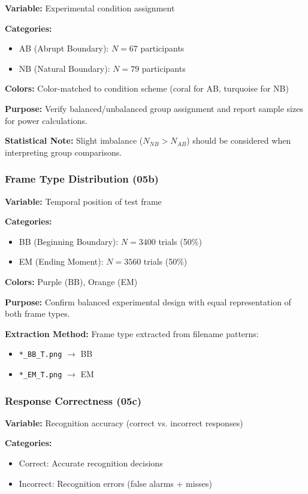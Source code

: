 \documentclass[12pt,a4paper]{article}
\begin{document}
\textbf{Variable:} Experimental condition assignment

\textbf{Categories:}
\begin{itemize}
    \item AB (Abrupt Boundary): $N=67$ participants
    \item NB (Natural Boundary): $N=79$ participants
\end{itemize}

\textbf{Colors:} Color-matched to condition scheme (coral for AB, turquoise for NB)

\textbf{Purpose:} Verify balanced/unbalanced group assignment and report sample sizes for power calculations.

\textbf{Statistical Note:} Slight imbalance ($N_{NB} > N_{AB}$) should be considered when interpreting group comparisons.

\subsubsection{Frame Type Distribution (05b)}

\textbf{Variable:} Temporal position of test frame

\textbf{Categories:}
\begin{itemize}
    \item BB (Beginning Boundary): $N=3400$ trials (50\%)
    \item EM (Ending Moment): $N=3560$ trials (50\%)
\end{itemize}

\textbf{Colors:} Purple (BB), Orange (EM)

\textbf{Purpose:} Confirm balanced experimental design with equal representation of both frame types.

\textbf{Extraction Method:} Frame type extracted from filename patterns:
\begin{itemize}
    \item \texttt{*\_BB\_T.png} $\rightarrow$ BB
    \item \texttt{*\_EM\_T.png} $\rightarrow$ EM
\end{itemize}

\subsubsection{Response Correctness (05c)}

\textbf{Variable:} Recognition accuracy (correct vs. incorrect responses)

\textbf{Categories:}
\begin{itemize}
    \item Correct: Accurate recognition decisions
    \item Incorrect: Recognition errors (false alarms + misses)
\end{itemize}
\end{document}
